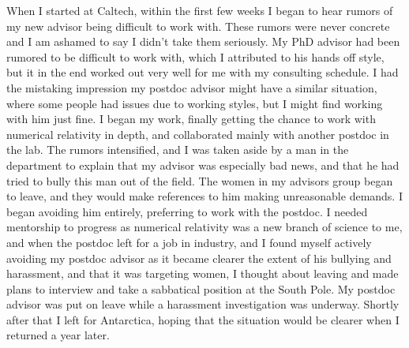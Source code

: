 \documentclass[utf8]{frontiersSCNS} %
\begin{document}
When I started at Caltech, within the first few weeks I began to hear rumors of my new advisor being difficult to work with. These rumors were never concrete and I am ashamed to say I didn't take them seriously. My PhD advisor had been rumored to be difficult to work with, which I attributed to his hands off style, but it in the end worked out very well for me with my consulting schedule. I had the mistaking impression my postdoc advisor might have a similar situation, where some people had issues due to working styles, but I might find working with him just fine. I began my work, finally getting the chance to work with numerical relativity in depth, and collaborated mainly with another postdoc in the lab. The rumors intensified, and I was taken aside by a man in the department to explain that my advisor was especially bad news, and that he had tried to bully this man out of the field. The women in my advisors group began to leave, and they would make references to him making unreasonable demands. I began avoiding him entirely, preferring to work with the postdoc. I needed mentorship to progress as numerical relativity was a new branch of science to me, and when the postdoc left for a job in industry, and I found myself actively avoiding my postdoc advisor as it became clearer the extent of his bullying and harassment, and that it was targeting women, I thought about leaving and made plans to interview and take a sabbatical position at the South Pole. My postdoc advisor was put on leave while a harassment investigation was underway. Shortly after that I left for Antarctica, hoping that the situation would be clearer when I returned a year later.
\end{document}
